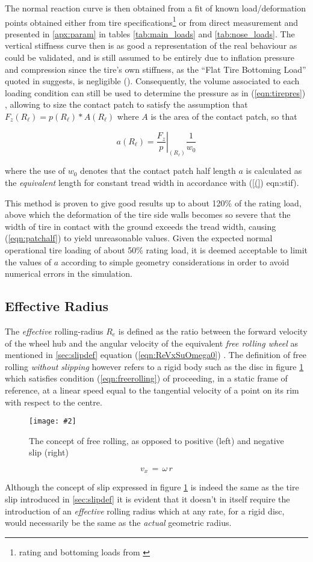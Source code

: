 \documentclass[12pt,a4paper]{report}
\newcommand{\virgolette}[1]{
\textquotedblleft #1\textquotedblright
}
\newcommand{\figura}[5][htbp]{
\begin{figure}[#1]
\begin{center}
\texttt{[image: \#2]}
\caption{#4}\label{#5}
\end{center}
\end{figure}
}
\newcommand{\eq}[2]{
\begin{equation} \label{#1}
#2
\end{equation}
}
\newcommand{\req}[1]{
(\ref{#1})
}
\begin{document}
The normal reaction curve is then obtained from a fit of known load/deformation points obtained either from tire specifications\footnote{rating and bottoming loads from \citep{GYtirespecs}} or from direct measurement and presented in \ref{apx:param} in tables \ref{tab:main_loads} and \ref{tab:nose_loads}.
The vertical stiffness curve then is as good a representation of the real behaviour as could be validated, and is still assumed to be entirely due to inflation pressure and compression since the tire's own stiffness, as the \virgolette{Flat Tire Bottoming Load} quoted in \cite{GYtires} suggests, is negligible (\citep{nhtsa}).
Consequently, the volume associated to each loading condition can still be used to determine the pressure as in \req{eqn:tirepres}, allowing to size the contact patch to satisfy the assumption that $F_z(R_\ell) = p(R_\ell) * A(R_\ell)$ where $A$ is the area of the contact patch, so that
\eq{eqn:patchalf}{a(R_\ell)=\left.\frac{F_z}{p}\right|_(R_\ell) \frac{1}{w_0}}
where the use of $w_0$ denotes that the contact patch half length $a$ is calculated as the \emph{equivalent} length for constant tread width in accordance with \req(eqn:stif).

This method is proven to give good results up to about 120\% of the rating load, above which the deformation of the tire side walls becomes so severe that the width of tire in contact with the ground exceeds the tread width, causing \req{eqn:patchalf} to yield unreasonable values.
Given the expected normal operational tire loading of about 50\% rating load, it is deemed acceptable to limit the values of $a$ according to simple geometry considerations in order to avoid numerical errors in the simulation.

\subsection{Effective Radius}
The \emph{effective} rolling-radius $R_e$ is defined as the ratio between the forward velocity of the wheel hub and the angular velocity of the equivalent \emph{free rolling wheel} as mentioned in \ref{sec:slipdef} equation \req{eqn:ReVxSuOmega0}. 
The definition of free rolling \emph{without slipping} however refers to a rigid body such as the disc in figure \ref{fig:freerolling} which satisfies condition \req{eqn:freerolling} of proceeding, in a static frame of reference, at a linear speed equal to the tangential velocity of a point on its rim with respect to the centre.

\figura{piczero.jpg}{}{The concept of free rolling, as opposed to positive (left) and negative slip (right)}{fig:freerolling}
\eq{eqn:freerolling}{v_x \, = \, \omega \, r}
Although the concept of slip expressed in figure \ref{fig:freerolling} is indeed the same as the tire slip introduced in \ref{sec:slipdef} it is evident that it doesn't in itself require the introduction of an \emph{effective} rolling radius which at any rate, for a rigid disc, would necessarily be the same as the \emph{actual} geometric radius.
\end{document}
